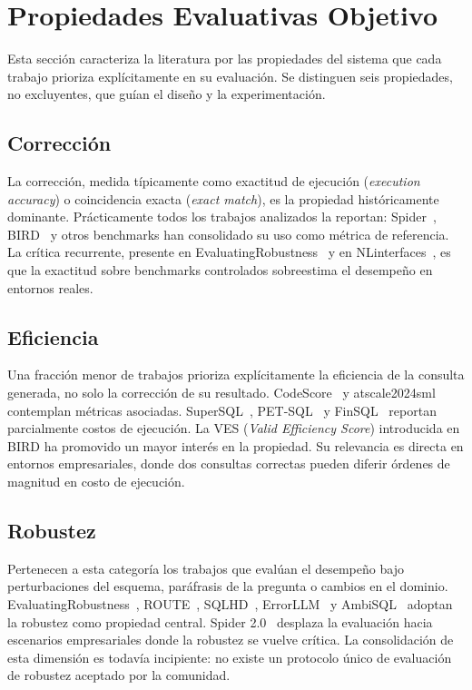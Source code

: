 \section{Propiedades Evaluativas Objetivo}
\label{sec:sota-d6-propiedades}

Esta sección caracteriza la literatura por las propiedades del sistema
que cada trabajo prioriza explícitamente en su evaluación. Se distinguen
seis propiedades, no excluyentes, que guían el diseño y la
experimentación.

\subsection{Corrección}
\label{subsec:sota-d6-correccion}

La corrección, medida típicamente como exactitud de ejecución
(\emph{execution accuracy}) o coincidencia exacta (\emph{exact match}),
es la propiedad históricamente dominante. Prácticamente todos los
trabajos analizados la reportan: Spider~\cite{spider2_2025},
BIRD~\cite{BIRD2023} y otros benchmarks han consolidado su uso como
métrica de referencia.
La crítica recurrente, presente en
EvaluatingRobustness~\cite{EvaluatingRobustness} y en
NLinterfaces~\cite{NLinterfaces}, es que la exactitud sobre benchmarks
controlados sobreestima el desempeño en entornos reales.

\subsection{Eficiencia}
\label{subsec:sota-d6-eficiencia}

Una fracción menor de trabajos prioriza explícitamente la eficiencia de
la consulta generada, no solo la corrección de su resultado.
CodeScore~\cite{CodeScore} y atscale2024sml~\cite{atscale2024sml}
contemplan métricas asociadas. SuperSQL~\cite{SuperSQL2024},
PET-SQL~\cite{PET-SQL2024} y FinSQL~\cite{FinSQL2024} reportan
parcialmente costos de ejecución. La VES (\emph{Valid Efficiency Score})
introducida en BIRD ha promovido un mayor interés en la propiedad. Su
relevancia es directa en entornos empresariales, donde dos consultas
correctas pueden diferir órdenes de magnitud en costo de ejecución.

\subsection{Robustez}
\label{subsec:sota-d6-robustez}

Pertenecen a esta categoría los trabajos que evalúan el desempeño bajo
perturbaciones del esquema, paráfrasis de la pregunta o cambios en el
dominio. EvaluatingRobustness~\cite{EvaluatingRobustness},
ROUTE~\cite{ROUTE2025}, SQLHD~\cite{SQLHD2025},
ErrorLLM~\cite{errorllm2026} y AmbiSQL~\cite{AmbiSQL} adoptan la
robustez como propiedad central. Spider 2.0~\cite{spider2_2025}
desplaza la evaluación hacia escenarios empresariales donde la
robustez se vuelve crítica. La consolidación de esta dimensión es
todavía incipiente: no existe un protocolo único de evaluación de
robustez aceptado por la comunidad.

